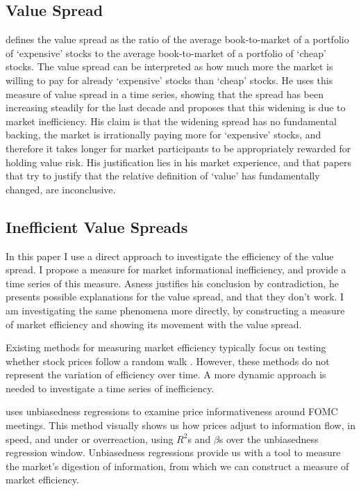 \subsection{Value Spread}
\citet{asness_2024} defines the value spread as the ratio of the average book-to-market of a portfolio of `expensive' stocks to the average book-to-market of
a portfolio of `cheap' stocks. The value spread can be interpreted as how much more the market is willing to pay for 
already `expensive' stocks than `cheap' stocks. He uses this measure of value spread in a time series, showing that the spread has been increasing steadily for the last decade
and proposes that this widening is due to market inefficiency. His claim is that the widening spread has no fundamental backing, the market is irrationally paying
more for `expensive' stocks, and therefore it takes longer for market participants to be appropriately rewarded for holding value risk.
His justification lies in his market experience, and that papers that try to justify that the relative definition of `value' has fundamentally changed, are inconclusive.

\subsection{Inefficient Value Spreads}
In this paper I use a direct approach to investigate the efficiency of the value spread. I propose a measure for market informational inefficiency, and provide a time series
of this measure. Asness justifies his conclusion by contradiction, he presents possible explanations for the value spread, and that they don't work. I am investigating
the same phenomena more directly, by constructing a measure of market efficiency and showing its movement with the value spread.

Existing methods for measuring market efficiency typically focus on testing whether stock prices follow a random walk
\citep{fama_random_walk} \citep{lim_brooks_2010}. However, these methods do not represent the variation of efficiency over time.
A more dynamic approach is needed to investigate a time series of inefficiency.

\citet{boguth_2023} uses unbiasedness regressions to examine price informativeness around FOMC meetings. 
This method visually shows us how prices adjust to information flow, in speed, and under or overreaction, using $R^2$s and $\beta$s over the unbiasedness regression window.
Unbiasedness regressions provide us with a tool to measure the market's digestion of information, from which we can construct a measure of market efficiency.

